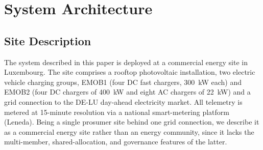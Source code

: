 \documentclass[journal]{IEEEtran}
\begin{document}
\section{System Architecture}
\label{sec:architecture}

\subsection{Site Description}
\label{sec:site}

The system described in this paper is deployed at a commercial energy
site in Luxembourg. The site comprises a rooftop photovoltaic
installation, two electric vehicle charging groups, EMOB1 (four DC
fast chargers, 300~kW each) and EMOB2 (four DC chargers of 400~kW and
eight AC chargers of 22~kW) and a grid connection to the DE-LU
day-ahead electricity market. All telemetry is metered at 15-minute
resolution via a national smart-metering platform (Leneda). Being a
single prosumer site behind one grid connection, we describe it as a
commercial energy site rather than an energy community, since it lacks
the multi-member, shared-allocation, and governance features of the
latter.
\end{document}
